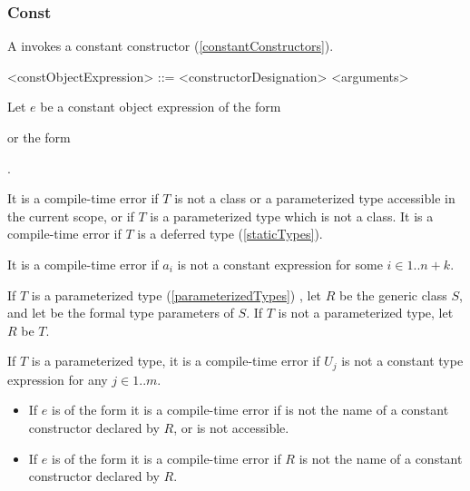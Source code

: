 \documentclass[makeidx]{article}
\begin{document}
{
\EndCase


\subsubsection{Const}

\LMHash{}%
A  invokes a constant constructor
(\ref{constantConstructors}).

\begin{grammar}
<constObjectExpression> ::= \CONST{} <constructorDesignation> <arguments>
\end{grammar}

\LMHash{}%
Let $e$ be a constant object expression of the form

or the form

.

\LMHash{}%
It is a compile-time error if $T$ is not
a class or a parameterized type accessible in the current scope,
or if $T$ is a parameterized type which is not a class.
It is a compile-time error if $T$ is a deferred type
(\ref{staticTypes}).

\LMHash{}%
It is a compile-time error if $a_i$ is not a constant expression
for some $i \in 1 .. n + k$.

\LMHash{}%
If $T$ is a parameterized type (\ref{parameterizedTypes})
,
let $R$ be the generic class $S$,
and let
be the formal type parameters of $S$.
If $T$ is not a parameterized type, let $R$ be $T$.

\LMHash{}%
If $T$ is a parameterized type,
it is a compile-time error if $U_j$ is not a constant type expression for any
$j \in 1 .. m$.

\begin{itemize}
\item
  If $e$ is of the form
  it is a compile-time error if  is not the name of
  a constant constructor declared by $R$, or \id{} is not accessible.
\item
  If $e$ is of the form
  it is a compile-time error if $R$ is not the name of
  a constant constructor declared by $R$.
\end{itemize}

}
\end{document}
